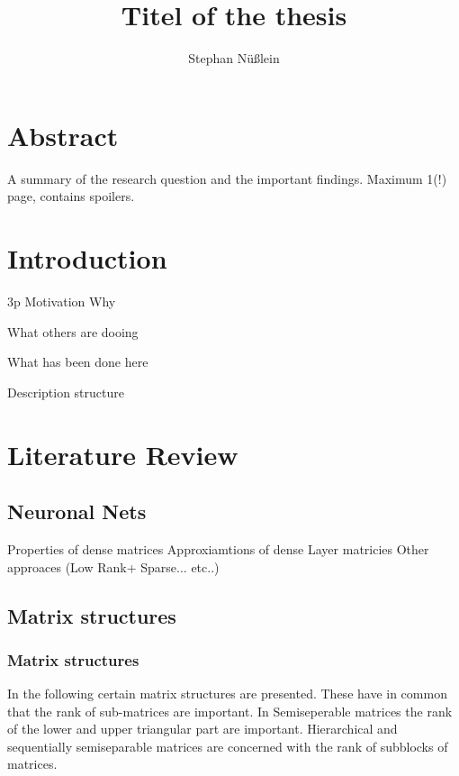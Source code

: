 \documentclass[doctype=mastersthesis,BCOR=15mm,biblatex]{ldvbook}%
\begin{document}
\title{Titel of the thesis}
\author{Stephan Nüßlein}


\maketitle[frontcover=Design1]


\chapter*{Abstract}

A summary of the research question and the important findings.
Maximum 1(!) page, contains spoilers.


\tableofcontents









\chapter{Introduction} 3p
Motivation Why

What others are dooing

What has been done here


Description structure


\chapter{Literature Review}
\section{Neuronal Nets}
Properties of dense matrices
Approxiamtions of dense Layer matricies
Other approaces (Low Rank+ Sparse... etc..)

\section{Matrix structures}
\subsection{Matrix structures}
In the following certain matrix structures are presented.
These have in common that the rank of sub-matrices are important.
In Semiseperable matrices the rank of the lower and upper triangular part are important.
Hierarchical and sequentially semiseparable matrices are concerned with the rank of subblocks of matrices.  
\end{document}
